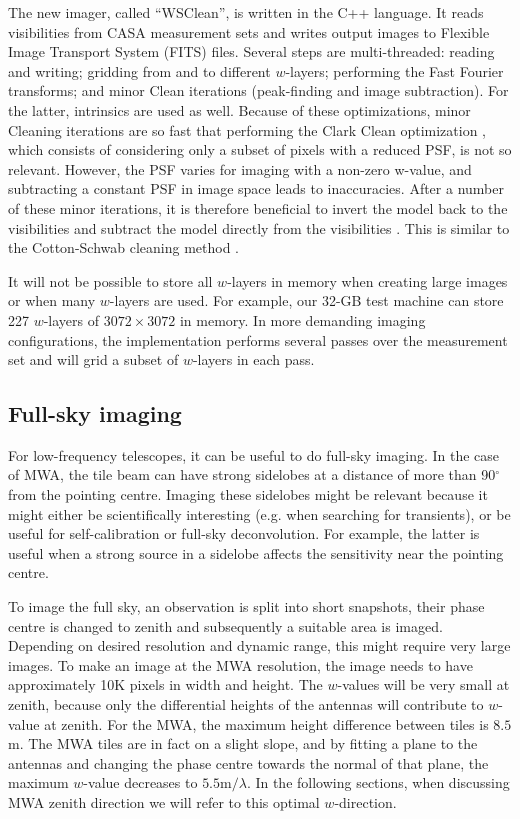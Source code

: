 \documentclass[useAMS,usenatbib]{mn2e}
\newcommand{\degree}{\ensuremath{^{\circ}}\xspace}
\begin{document}
The new imager, called ``WSClean'', is written in the C++ language. It reads visibilities from CASA measurement sets and writes output images to Flexible Image Transport System (FITS) files. Several steps are multi-threaded: reading and writing; gridding from and to different $w$-layers; performing the Fast Fourier transforms; and minor Clean iterations (peak-finding and image subtraction). For the latter, intrinsics are used as well. Because of these optimizations, minor Cleaning iterations are so fast that performing the Clark Clean optimization \citep{clark-clean}, which consists of considering only a subset of pixels with a reduced PSF, is not so relevant. However, the PSF varies for imaging with a non-zero w-value, and subtracting a constant PSF in image space leads to inaccuracies. After a number of these minor iterations, it is therefore beneficial to invert the model back to the visibilities and subtract the model directly from the visibilities \citep{wprojection-cornwell}. This is similar to the Cotton-Schwab cleaning method \citep{cotton-schwab-clean}.

It will not be possible to store all $w$-layers in memory when creating large images or when many $w$-layers are used. For example, our 32-GB test machine can store 227 $w$-layers of $3072\times3072$ in memory. In more demanding imaging configurations, the implementation performs several passes over the measurement set and will grid a subset of $w$-layers in each pass.

\subsection{Full-sky imaging}
For low-frequency telescopes, it can be useful to do full-sky imaging. In the case of MWA, the tile beam can have strong sidelobes at a distance of more than 90\degree from the pointing centre. Imaging these sidelobes might be relevant because it might either be scientifically interesting (e.g. when searching for transients), or be useful for self-calibration or full-sky deconvolution. For example, the latter is useful when a strong source in a sidelobe affects the sensitivity near the pointing centre.

To image the full sky, an observation is split into short snapshots, their phase centre is changed to zenith and subsequently a suitable area is imaged. Depending on desired resolution and dynamic range, this might require very large images. To make an image at the MWA resolution, the image needs to have approximately 10K pixels in width and height. The $w$-values will be very small at zenith, because only the differential heights of the antennas will contribute to $w$-value at zenith. For the MWA, the maximum height difference between tiles is $8.5$m. The MWA tiles are in fact on a slight slope, and by fitting a plane to the antennas and changing the phase centre towards the normal of that plane, the maximum $w$-value decreases to $5.5\textrm{m} / \lambda$. In the following sections, when discussing MWA zenith direction we will refer to this optimal $w$-direction.
\end{document}
